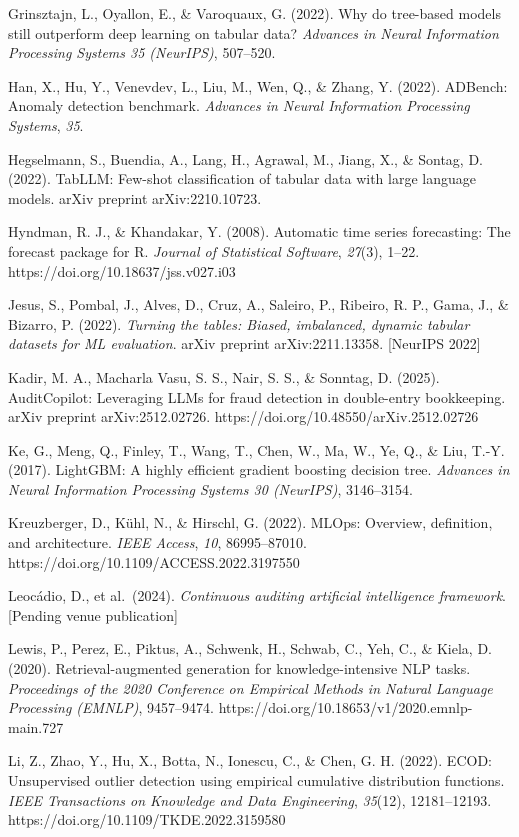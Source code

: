 Grinsztajn, L., Oyallon, E., \& Varoquaux, G. (2022). Why do tree-based
models still outperform deep learning on tabular data? \emph{Advances in
Neural Information Processing Systems 35 (NeurIPS)}, 507--520.

Han, X., Hu, Y., Venevdev, L., Liu, M., Wen, Q., \& Zhang, Y. (2022).
ADBench: Anomaly detection benchmark. \emph{Advances in Neural
Information Processing Systems}, \emph{35}.

Hegselmann, S., Buendia, A., Lang, H., Agrawal, M., Jiang, X., \&
Sontag, D. (2022). TabLLM: Few-shot classification of tabular data with
large language models. arXiv preprint arXiv:2210.10723.

Hyndman, R. J., \& Khandakar, Y. (2008). Automatic time series
forecasting: The forecast package for R. \emph{Journal of Statistical
Software}, \emph{27}(3), 1--22. https://doi.org/10.18637/jss.v027.i03

Jesus, S., Pombal, J., Alves, D., Cruz, A., Saleiro, P., Ribeiro, R. P.,
Gama, J., \& Bizarro, P. (2022). \emph{Turning the tables: Biased,
imbalanced, dynamic tabular datasets for ML evaluation}. arXiv preprint
arXiv:2211.13358. {[}NeurIPS 2022{]}

Kadir, M. A., Macharla Vasu, S. S., Nair, S. S., \& Sonntag, D. (2025).
AuditCopilot: Leveraging LLMs for fraud detection in double-entry
bookkeeping. arXiv preprint arXiv:2512.02726.
https://doi.org/10.48550/arXiv.2512.02726

Ke, G., Meng, Q., Finley, T., Wang, T., Chen, W., Ma, W., Ye, Q., \&
Liu, T.-Y. (2017). LightGBM: A highly efficient gradient boosting
decision tree. \emph{Advances in Neural Information Processing Systems
30 (NeurIPS)}, 3146--3154.

Kreuzberger, D., Kühl, N., \& Hirschl, G. (2022). MLOps: Overview,
definition, and architecture. \emph{IEEE Access}, \emph{10},
86995--87010. https://doi.org/10.1109/ACCESS.2022.3197550

Leocádio, D., et al.~(2024). \emph{Continuous auditing artificial
intelligence framework}. {[}Pending venue publication{]}

Lewis, P., Perez, E., Piktus, A., Schwenk, H., Schwab, C., Yeh, C., \&
Kiela, D. (2020). Retrieval-augmented generation for knowledge-intensive
NLP tasks. \emph{Proceedings of the 2020 Conference on Empirical Methods
in Natural Language Processing (EMNLP)}, 9457--9474.
https://doi.org/10.18653/v1/2020.emnlp-main.727

Li, Z., Zhao, Y., Hu, X., Botta, N., Ionescu, C., \& Chen, G. H. (2022).
ECOD: Unsupervised outlier detection using empirical cumulative
distribution functions. \emph{IEEE Transactions on Knowledge and Data
Engineering}, \emph{35}(12), 12181--12193.
https://doi.org/10.1109/TKDE.2022.3159580

